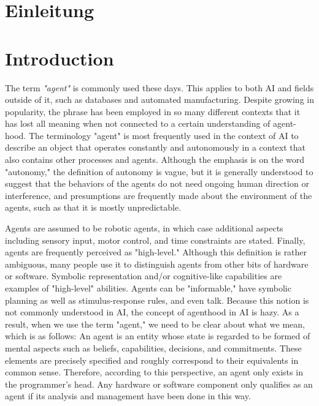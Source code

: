 {\chapter{Einleitung}}
{\chapter{Introduction}}

\label{sec:introduction}


The term \textit{"agent"} is commonly used these days. This applies to both \ac{AI} and fields outside of it, such as databases and automated manufacturing. Despite growing in popularity, the phrase has been employed in so many different contexts that it has lost all meaning when not connected to a certain understanding of agent-hood. The terminology "agent" is most frequently used in the context of  \ac{AI} to describe an object that operates constantly and autonomously in a context that also contains other processes and agents. Although the emphasis is on the word "autonomy,"  the definition of autonomy is vague, but it is generally understood to suggest that the behaviors of the agents do not need ongoing human direction or interference, and presumptions are frequently made about the environment of the agents, such as that it is mostly unpredictable.

\vspace{.5cm}

Agents are assumed to be robotic agents, in which case additional aspects including sensory input, motor control, and time constraints are stated. Finally, agents are frequently perceived as "high-level." Although this definition is rather ambiguous, many people use it to distinguish agents from other bits of hardware or software. Symbolic representation and/or cognitive-like capabilities are examples of "high-level" abilities. Agents can be "informable," have symbolic planning as well as stimulus-response rules, and even talk. Because this notion is not commonly understood in \ac{AI}, the concept of agenthood in \ac{AI} is hazy. As a result, when we use the term "agent," we need to be clear about what we mean, which is as follows: An agent is an entity whose state is regarded to be formed of mental aspects such as beliefs, capabilities, decisions, and commitments. These elements are precisely specified and roughly correspond to their equivalents in common sense. Therefore, according to this perspective, an agent only exists in the programmer's head. Any hardware or software component only qualifies as an agent if its analysis and management have been done in this way.

